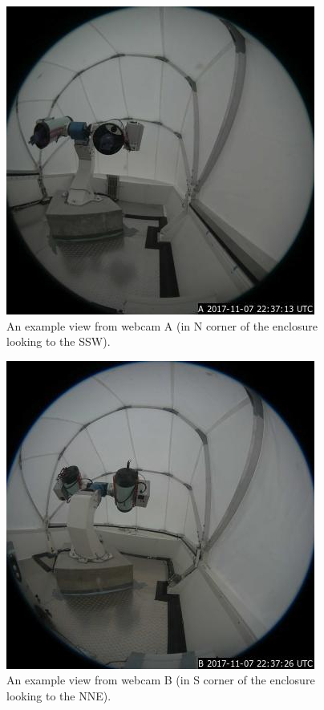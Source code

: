 \begin{figure}
\begin{center}
\includegraphics[width=0.8\linewidth]{figures/interface-ddoti-webcam-a.jpg}
\end{center}
\caption{An example view from webcam A (in N corner of the enclosure looking to the SSW).}
\label{figure:interface-webcam-a}
\end{figure}

\begin{figure}
\begin{center}
\includegraphics[width=0.8\linewidth]{figures/interface-ddoti-webcam-b.jpg}
\end{center}
\caption{An example view from webcam B (in S corner of the enclosure looking to the NNE).}
\label{figure:interface-webcam-b}
\end{figure}

